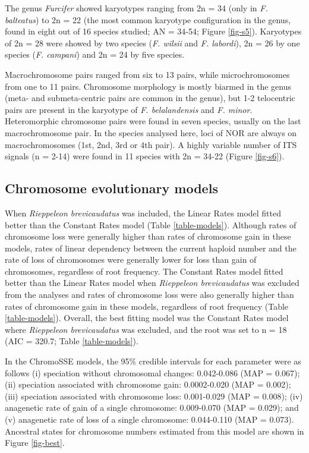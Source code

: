 \documentclass[a4paper, 12pt]{article}
\begin{document}
\noindent The genus \textit{Furcifer} showed karyotypes ranging from 2n = 34 (only in \textit{F. balteatus}) to 2n = 22 (the most common karyotype configuration in the genus, found in eight out of 16 species studied; AN = 34-54; Figure \ref{fig-s5}). 
Karyotypes of 2n = 28 were showed by two species (\textit{F. wilsii} and \textit{F. labordi}), 2n = 26 by one species (\textit{F. campani}) and 2n = 24 by five species. 

\noindent Macrochromosome pairs ranged from six to 13 pairs, while microchromosomes from one to 11 pairs. 
Chromosome morphology is mostly biarmed in the genus (meta- and submeta-centric pairs are common in the genus), but 1-2 telocentric pairs are present in the karyotype of \textit{F. belalandensis} and \textit{F. minor}.
Heteromorphic chromosome pairs were found in seven species, usually on the last macrochromosome pair. 
In the species analysed here, loci of NOR are always on macrochromosomes (1st, 2nd, 3rd or 4th pair). 
A highly variable number of ITS signals (n = 2-14) were found in 11 species with 2n = 34-22 (Figure \ref{fig-s6}).

\subsection{Chromosome evolutionary models}
When \textit{Rieppeleon brevicaudatus} was included, the Linear Rates model fitted better than the Constant Rates model (Table \ref{table-models}).
Although rates of chromosome loss were generally higher than rates of chromosome gain in these models, rates of linear dependency between the current haploid number and the rate of loss of chromosomes were generally lower for loss than gain of chromosomes, regardless of root frequency. 
The Constant Rates model fitted better than the Linear Rates model when \textit{Rieppeleon brevicaudatus} was excluded from the analyses and rates of chromosome loss were also generally higher than rates of chromosome gain in these models, regardless of root frequency (Table \ref{table-models}). 
Overall, the best fitting model was the Constant Rates model where \textit{Rieppeleon brevicaudatus} was excluded, and the root was set to n = 18 (AIC = 320.7; Table \ref{table-models}).

In the ChromoSSE models, the 95\% credible intervals for each parameter were as follows (i) speciation without chromosomal changes: 0.042-0.086 (MAP = 0.067); (ii) speciation associated with chromosome gain: 0.0002-0.020 (MAP = 0.002); (iii) speciation associated with chromosome loss: 0.001-0.029 (MAP = 0.008); (iv) anagenetic rate of gain of a single chromosome: 0.009-0.070 (MAP = 0.029); and (v) anagenetic rate of loss of a single chromosome: 0.044-0.110 (MAP = 0.073). 
Ancestral states for chromosome numbers estimated from this model are shown in Figure \ref{fig-best}.
\end{document}
